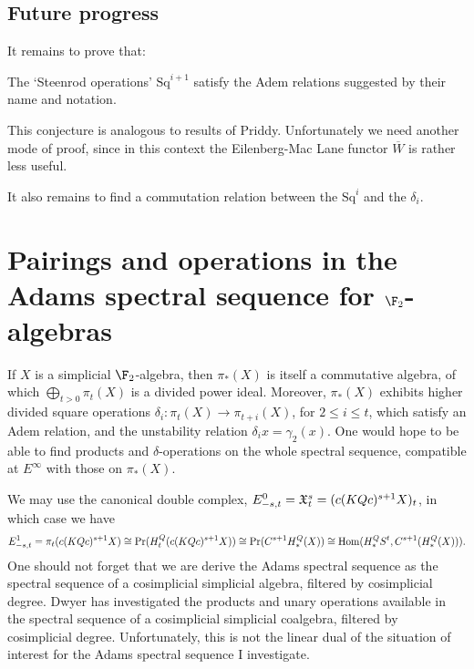 \documentclass[11pt]{article}
\newcommand{\Sq}{\mathrm{Sq}}
\begin{document}
\subsection{Future progress}
It remains to prove that:
\begin{conjecture}
The `Steenrod operations' $\Sq^{i+1}$ satisfy the Adem relations suggested by their name and notation.
\end{conjecture}
\noindent This conjecture is analogous to results \cite[5.3]{PriddySimplicialLie.pdf} of Priddy. Unfortunately we need another mode of proof, since in this context the Eilenberg-Mac Lane functor $\overline{W}$ is rather less useful.

It also remains to find a commutation relation between the $\Sq^i$ and the $\delta_i$.

\section{Pairings and operations in the Adams spectral sequence for $\F_2$-algebras}
If $X$ is a simplicial $\F_2$-algebra, then $\pi_*(X)$ is itself a commutative algebra, of which $\bigoplus_{t>0}\pi_{t}(X)$ is a divided power ideal. Moreover, $\pi_*(X)$ exhibits higher divided square operations $\delta_i:\pi_t(X)\to \pi_{t+i}(X)$, for $2\leq i \leq t$, which satisfy an Adem relation, and the unstability relation $\delta_ix=\gamma_2(x)$. One would hope to be able to find products and $\delta$-operations on the whole spectral sequence, compatible at $E^\infty$ with those on $\pi_*(X)$.

We may use the canonical double complex, $E^0_{-s,t}=\mathfrak{X}^s_t=(c(KQc)^{s+1}X)_t$, in which case we have 
\[E^1_{-s,t}=\pi_t(c(KQc)^{s+1}X)\cong \textup{Pr}(H_t^Q(c(KQc)^{s+1}X))\cong \textup{Pr}(C^{s+1}H_*^Q(X))\cong \operatorname{Hom}(H_*^QS^t,C^{s+1}(H^Q_*(X))).\]
One should not forget that we are derive the Adams spectral sequence as the spectral sequence of a cosimplicial simplicial algebra, filtered by cosimplicial degree. Dwyer \cite{DwyerHigherDividedSquares.pdf} has investigated the products and unary operations available in the spectral sequence of a cosimplicial simplicial coalgebra, filtered by cosimplicial degree. Unfortunately, this is not the linear dual of the situation of interest for the Adams spectral sequence I investigate.
\end{document}
